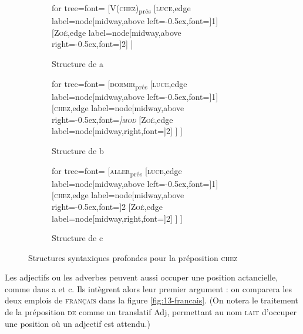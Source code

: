 \begin{figure}
	\begin{subfigure}[b]{0.3\textwidth}
		\centering
		\begin{forest} for tree={font=\normalfont}
			[V(\textsc{chez})\textsubscript{prés}
			[\textsc{luce},edge label={node[midway,above left=-0.5ex,font=\footnotesize]{1}}]
			[\textsc{Zoé},edge label={node[midway,above right=-0.5ex,font=\footnotesize]{2}}]
			]
		\end{forest}
		\caption{Structure de a}
	\end{subfigure}%
	\hfill
	\begin{subfigure}[b]{0.3\textwidth}
		\centering
		\begin{forest} for tree={font=\normalfont}
			[\textsc{dormir}\textsubscript{prés}
			[\textsc{luce},edge label={node[midway,above left=-0.5ex,font=\footnotesize]{1}}]
			[\textsc{chez},edge label={node[midway,above right=-0.5ex,font=\footnotesize\itshape]{\textsc{mod}}}
			[\textsc{Zoé},edge label={node[midway,right,font=\footnotesize]{2}}]
			]
			]
		\end{forest}
		\caption{Structure de b}
	\end{subfigure}%
	\hfill
	\begin{subfigure}[b]{0.3\textwidth}
		\centering
		\begin{forest} for tree={font=\normalfont}
			[\textsc{aller}\textsubscript{prés}
			[\textsc{luce},edge label={node[midway,above left=-0.5ex,font=\footnotesize]{1}}]
			[\textsc{chez},edge label={node[midway,above right=-0.5ex,font=\footnotesize]{2}}
			[\textsc{Zoé},edge label={node[midway,right,font=\footnotesize]{2}}]
			]
			]
		\end{forest}
		\caption{Structure de c}
	\end{subfigure}
\caption{Structures syntaxiques profondes pour la préposition \textsc{chez}\label{fig:chez}}
\end{figure}

Les adjectifs ou les adverbes peuvent aussi occuper une position actancielle, comme dans a et c. Ils intègrent alors leur premier argument : on comparera les deux emplois de \textsc{français} dans la figure \ref{fig:13-francais}. (On notera le traitement de la préposition \textsc{de} comme un translatif Adj, permettant au nom \textsc{lait} d'occuper une position où un adjectif est attendu.)


